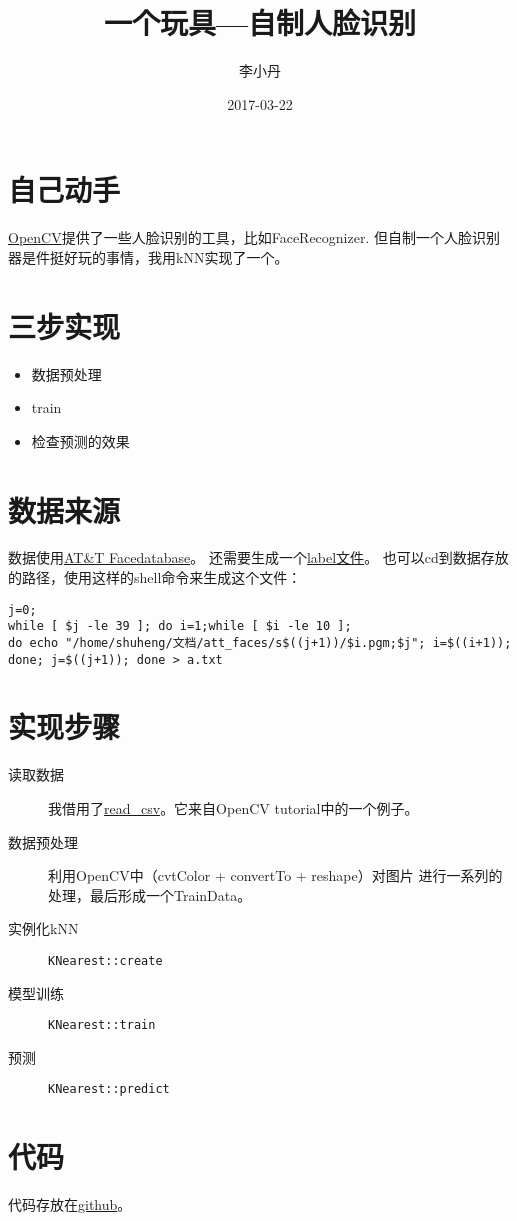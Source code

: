 \documentclass[a4paper]{article}
\begin{document}
\begin{CJK}{UTF8}{gkai}
	\title{一个玩具---自制人脸识别}
	\author{李小丹}
	\date{2017-03-22}

	\maketitle
\end{CJK}

\begin{CJK}{UTF8}{gbsn}

	\section*{自己动手}
	\href{http://opencv.org/}{OpenCV}提供了一些人脸识别的工具，比如FaceRecognizer.
	但自制一个人脸识别器是件挺好玩的事情，我用kNN实现了一个。

	\section*{三步实现}
	\begin{itemize}
		\item 数据预处理
		\item train
		\item 检查预测的效果
	\end{itemize}

	\section*{数据来源}
	数据使用\href{http://www.cl.cam.ac.uk/research/dtg/attarchive/facedatabase.html}
	{AT\&T Facedatabase}。
	还需要生成一个\href{http://docs.opencv.org/3.1.0/da/d60/tutorial_face_main.html#tutorial_face_prepare}{label文件}。
	也可以cd到数据存放的路径，使用这样的shell命令来生成这个文件：
	\begin{verbatim}
j=0;
while [ $j -le 39 ]; do i=1;while [ $i -le 10 ];
do echo "/home/shuheng/文档/att_faces/s$((j+1))/$i.pgm;$j"; i=$((i+1));
done; j=$((j+1)); done > a.txt
	\end{verbatim}

	\section*{实现步骤}
	\begin{description}
		\item [读取数据] 我借用了\href{http://docs.opencv.org/3.1.0/da/d60/tutorial_face_main.html#tutorial_face_fisherfaces_use}
			{read\_csv}。它来自OpenCV tutorial中的一个例子。
		\item [数据预处理] 利用OpenCV中（cvtColor + convertTo + reshape）对图片
			进行一系列的处理，最后形成一个TrainData。
		\item [实例化kNN] {\verb|KNearest::create|}
		\item [模型训练]  {\verb|KNearest::train|}
		\item [预测]   {\verb|KNearest::predict|}
	\end{description}

	\section*{代码}
	代码存放在\href{https://github.com/leeshuheng/toy_knn_face_rec}{github}。

\clearpage\end{CJK}
\end{document}
